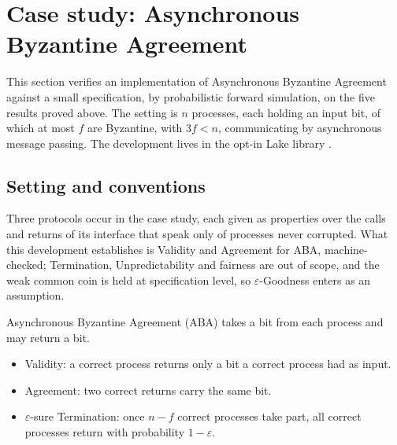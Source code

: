 











\section{Case study: Asynchronous Byzantine Agreement}

This section verifies an implementation of Asynchronous Byzantine Agreement against a small specification, by probabilistic forward simulation, on the five results proved above.
The setting is $n$ processes, each holding an input bit, of which at most $f$ are Byzantine, with $3f < n$, communicating by asynchronous message passing.
The development lives in the opt-in Lake library .

\subsection{Setting and conventions}

Three protocols occur in the case study, each given as properties over the calls and returns of its interface that speak only of processes never corrupted.
What this development establishes is Validity and Agreement for ABA, machine-checked; Termination, Unpredictability and fairness are out of scope, and the weak common coin is held at specification level, so $\varepsilon$-Goodness enters as an assumption.

Asynchronous Byzantine Agreement (ABA) takes a bit from each process and may return a bit.
\begin{itemize}
  \item Validity: a correct process returns only a bit a correct process had as input.
  \item Agreement: two correct returns carry the same bit.
  \item $\varepsilon$-sure Termination: once $n-f$ correct processes take part, all correct processes return with probability $1-\varepsilon$.
\end{itemize}

